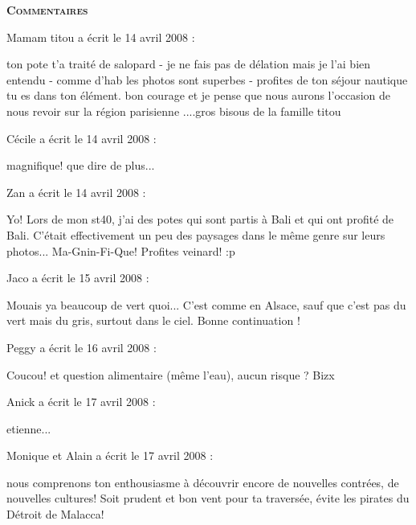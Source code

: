 \bigskip
\textbf{\textsc{Commentaires}}

\medskip
Mamam titou a écrit le 14 avril 2008 :
\begin{displayquote}
ton pote t'a traité de salopard - je ne fais pas de  délation mais je l'ai bien entendu - comme d'hab les photos sont superbes - profites de ton séjour nautique tu es dans ton élément. bon courage et je pense que nous aurons l'occasion de nous revoir sur la région parisienne ....gros bisous de la famille titou
\end{displayquote}

\medskip
Cécile a écrit le 14 avril 2008 :
\begin{displayquote}
magnifique! que dire de plus...
\end{displayquote}

\medskip
Zan a écrit le 14 avril 2008 :
\begin{displayquote}
Yo!
Lors de mon st40, j'ai des potes qui sont partis à Bali et qui ont profité de Bali. C'était effectivement un peu des paysages dans le même genre sur leurs photos... Ma-Gnin-Fi-Que!
Profites veinard! :p
\end{displayquote}

\medskip
Jaco a écrit le 15 avril 2008 :
\begin{displayquote}
Mouais ya beaucoup de vert quoi... C'est comme en Alsace, sauf que c'est pas du vert mais du gris, surtout dans le ciel.
Bonne continuation !
\end{displayquote}

\medskip
Peggy a écrit le 16 avril 2008 :
\begin{displayquote}
Coucou!
et question alimentaire (même l'eau), aucun risque ?
Bizx
\end{displayquote}

\medskip
Anick a écrit le 17 avril 2008 :
\begin{displayquote}
etienne...
\end{displayquote}

\medskip
Monique et Alain a écrit le 17 avril 2008 :
\begin{displayquote}
nous comprenons ton enthousiasme à découvrir encore de nouvelles contrées, de nouvelles cultures! Soit prudent et bon vent pour ta traversée, évite les pirates du Détroit de Malacca!
\end{displayquote}

